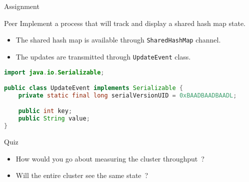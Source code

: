 \begin{frame}[fragile]{Assignment}
    \begin{block}{Peer}
        Implement a process that will track and display a shared hash map state.
        \begin{itemize}
            \item The shared hash map is available through \lstinline{SharedHashMap} channel.
            \item The updates are transmitted through \lstinline{UpdateEvent} class.
        \end{itemize}
    \end{block}

\begin{lstlisting}[language=java,style=mini]
import java.io.Serializable;

public class UpdateEvent implements Serializable {
    private static final long serialVersionUID = 0xBAADBAADBAADL;

    public int key;
    public String value;
}
\end{lstlisting}

    \begin{block}{Quiz}
        \begin{itemize}
            \item How would you go about measuring the cluster throughput~?
            \item Will the entire cluster see the same state~?
        \end{itemize}
    \end{block}
\end{frame}
